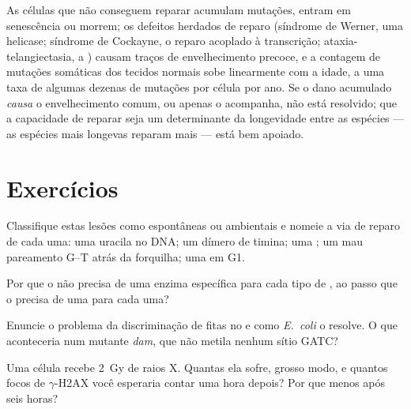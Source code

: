 \begin{remark}\label{rem:b3:dna-repair:ageing}
As células que não conseguem reparar acumulam mutações, entram em
senescência ou morrem; os defeitos herdados de reparo (síndrome de
Werner, uma helicase; síndrome de Cockayne, o reparo acoplado à
transcrição; ataxia-telangiectasia, a ) causam traços de
envelhecimento precoce, e a contagem de mutações somáticas dos tecidos
normais sobe linearmente com a idade, a uma taxa de algumas dezenas de
mutações por célula por ano. Se o dano acumulado \emph{causa} o
envelhecimento comum, ou apenas o acompanha, não está resolvido; que a
capacidade de reparar seja um determinante da longevidade entre as
espécies --- as espécies mais longevas reparam mais --- está bem
apoiado.
\end{remark}

\section{Exercícios}

\begin{exercise}[$\star$]\label{exo:b3:dna-repair:1}
Classifique estas lesões como espontâneas ou ambientais e nomeie a via
de reparo de cada uma: uma uracila no DNA; um dímero de timina; uma
; um mau pareamento G--T atrás da forquilha; uma  em G1.
\end{exercise}

\begin{exercise}[$\star$]\label{exo:b3:dna-repair:2}
Por que o  não precisa de uma enzima
específica para cada tipo de , ao passo que o  precisa de uma  para cada uma?
\end{exercise}

\begin{exercise}[$\star$]\label{exo:b3:dna-repair:3}
Enuncie o problema da discriminação de fitas no  e como \emph{E.~coli} o resolve. O que aconteceria num
mutante \emph{dam}, que não metila nenhum sítio GATC?
\end{exercise}

\begin{exercise}[$\star$]\label{exo:b3:dna-repair:4}
Uma célula recebe \qty{2}{Gy} de raios X. Quantas  ela sofre, grosso modo, e quantos focos de $\gamma$-H2AX você
esperaria contar uma hora depois? Por que menos após seis horas?
\end{exercise}

